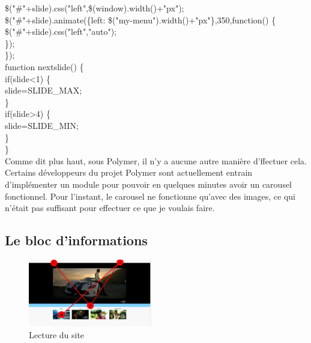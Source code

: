 \documentclass{article}
\begin{document}
{{\hspace*{0.6cm}\$("\#"+slide).css("left",\$(window).width()+"px");\\
\hspace*{0.6cm}\$("\#"+slide).animate(\{left: \$("my-menu").width()+"px"\},350,function() \{\\
\hspace*{1.2cm}\$("\#"+slide).css("left","auto");\\
\hspace*{0.6cm}\});		\\
\});\\
function nextslide() \{\\
\hspace*{0.6cm}if(slide<1) \{\\
\hspace*{1.2cm}slide=SLIDE\_MAX;\\
\hspace*{0.6cm}\} \\
\hspace*{0.6cm}if(slide>4) \{\\
\hspace*{1.2cm}slide=SLIDE\_MIN;\\
\hspace*{0.6cm}\}\\
\}
}}	
\vspace{0.5cm}\\
Comme dit plus haut, sous Polymer, il n'y a aucune autre mani\`ere d'ffectuer cela. Certains d\'eveloppeurs du projet Polymer sont actuellement entrain d'impl\'ementer un module pour pouvoir en quelques minutes avoir un carousel fonctionnel. Pour l'instant, le carousel ne fonctionne qu'avec des images, ce qui n'\'etait pas suffisant pour effectuer ce que je voulais faire.

\subsection{Le bloc d'informations}

\begin{figure}
  \vspace{-25pt}
  \begin{center}
    \includegraphics[width=0.48\textwidth]{p20}
  \end{center}
  \vspace{-20pt}
  \caption{Lecture du site}
  \vspace{-10pt}
\end{figure} 
\end{document}

